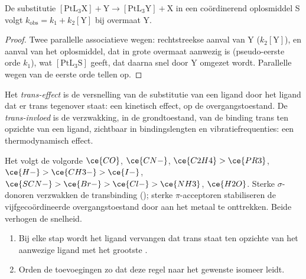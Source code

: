 \begin{proposition}\label{prop:b3:complex-mechanisms:square-planar}
De substitutie $\mathrm{[PtL_3X] + Y \to [PtL_3Y] + X}$ in een coördinerend oplosmiddel S volgt
$k_{\mathrm{obs}} = k_1 + k_2[\mathrm Y]$ bij overmaat Y.
\end{proposition}

\begin{proof}
Twee parallelle associatieve wegen: rechtstreekse aanval van Y ($k_2[\mathrm Y]$), en aanval van het
oplosmiddel, dat in grote overmaat aanwezig is (pseudo-eerste orde $k_1$), wat $[\mathrm{PtL_3S}]$ geeft, dat
daarna snel door Y omgezet wordt. Parallelle wegen van de eerste orde
tellen op.
\end{proof}

\begin{definition}\label{def:b3:complex-mechanisms:trans-effect}
Het \emph{trans-effect} is de versnelling van de
substitutie van een ligand door het ligand dat er trans tegenover staat:
een kinetisch effect, op de overgangstoestand.
De \emph{trans-invloed} is de verzwakking, in de
grondtoestand, van de binding trans ten opzichte van een ligand, zichtbaar
in bindingslengten en vibratiefrequenties: een thermodynamisch effect.
\end{definition}

Het  volgt de volgorde $\ce{CO}$, $\ce{CN-}$, $\ce{C2H4} > \ce{PR3}$, $\ce{H-} > \ce{CH3-} > \ce{I-}$, $\ce{SCN-} >
\ce{Br-} > \ce{Cl-} > \ce{NH3}$, $\ce{H2O}$. Sterke $\sigma$-donoren verzwakken de transbinding ();
sterke $\pi$-acceptoren stabiliseren de vijfgecoördineerde overgangstoestand door
 aan het metaal te onttrekken. Beide verhogen de
snelheid.

\begin{method}\label{met:b3:complex-mechanisms:pt-synthesis}
\begin{enumerate}
  \item Bij elke stap wordt het ligand vervangen dat trans staat ten
        opzichte van het aanwezige ligand met het grootste .
  \item Orden de toevoegingen zo dat deze regel naar het gewenste isomeer
        leidt.
\end{enumerate}
\end{method}

